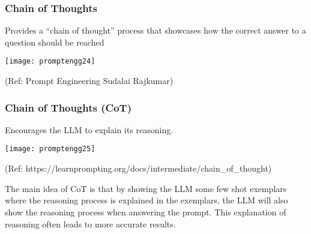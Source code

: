 \begin{frame}[fragile]\frametitle{Chain of Thoughts}

Provides a “chain of thought” process that 
showcases how the correct answer to a question should be reached

\begin{center}
\texttt{[image: promptengg24]}

{\tiny (Ref: Prompt Engineering Sudalai Rajkumar)}

\end{center}		

\end{frame}

\begin{frame}[fragile]\frametitle{Chain of Thoughts (CoT)}

Encourages the LLM to explain its reasoning. 

\begin{center}
\texttt{[image: promptengg25]}

{\tiny (Ref: https://learnprompting.org/docs/intermediate/chain\_of\_thought)}

\end{center}		

The main idea of CoT is that by showing the LLM some few shot exemplars where the reasoning process is explained in the exemplars, the LLM will also show the reasoning process when answering the prompt. This explanation of reasoning often leads to more accurate results.

\end{frame}








			




